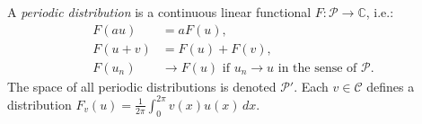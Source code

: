 A \textit{periodic distribution} is a continuous linear functional $F: \mathcal{P} \to \mathbb{C}$, i.e.:
\begin{align}
F(au) &= aF(u), \\
F(u + v) &= F(u) + F(v), \\
F(u_n) &\to F(u) \text{ if } u_n \to u \text{ in the sense of } \mathcal{P}.
\end{align}
The space of all periodic distributions is denoted $\mathcal{P}'$. Each $v \in \mathcal{C}$ defines a distribution $F_v(u) = \frac{1}{2\pi} \int_0^{2\pi} v(x)u(x)\,dx$.

